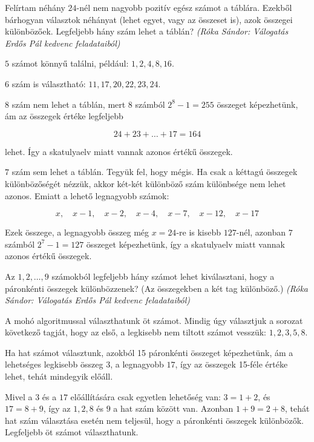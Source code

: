 \begin{extraproblem}
Felírtam néhány $24$-nél nem nagyobb pozitív egész számot a táblára.
Ezekből bárhogyan választok néhányat (lehet egyet, vagy az összeset
is), azok összegei különbözőek. Legfeljebb hány szám lehet a táblán?
\emph{(Róka Sándor: Válogatás Erdős Pál kedvenc feladataiból) }
\end{extraproblem}
\begin{solution}
$5$ számot könnyű találni, például: $1,2,4,8,16$.

$6$ szám is választható: $11,17,20,22,23,24$.

$8$ szám nem lehet a táblán, mert 8 számból $2^{8}-1=255$ összeget
képezhetünk, ám az összegek értéke legfeljebb

\[
24+23+\ldots+17=164
\]

lehet. Így a skatulyaelv miatt vannak azonos értékű összegek.

$7$ szám sem lehet a táblán. Tegyük fel, hogy mégis. Ha csak a kéttagú
összegek különbözőségét nézzük, akkor két-két különböző szám különbsége
nem lehet azonos. Emiatt a lehető legnagyobb számok:

\[
x,\quad x-1,\quad x-2,\quad x-4,\quad x-7,\quad x-12,\quad x-17
\]

Ezek összege, a legnagyobb összeg még $x=24$-re is kisebb $127$-nél,
azonban $7$ számból $2^{7}-1=127$ összeget képezhetünk, így a skatulyaelv
miatt vannak azonos értékű összegek.
\end{solution}
\begin{extraproblem}
Az $1,2,\ldots,9$ számokból legfeljebb hány számot lehet kiválasztani,
hogy a páronkénti összegek különbözzenek? (Az összegekben a két tag
különböző.) \emph{(Róka Sándor: Válogatás Erdős Pál kedvenc feladataiból) }
\end{extraproblem}
\begin{solution}
A mohó algoritmussal választhatunk öt számot. Mindig úgy választjuk
a sorozat következő tagját, hogy az első, a legkisebb nem tiltott
számot vesszük: $1,2,3,5,8$.

Ha hat számot választunk, azokból 15 páronkénti összeget képezhetünk,
ám a lehetséges legkisebb összeg $3$, a legnagyobb $17$, így az
összegek 15-féle értéke lehet, tehát mindegyik előáll.

Mivel a $3$ és a $17$ előállítására csak egyetlen lehetőség van:
$3=1+2$, és $17=8+9$, így az $1,2,8$ és $9$ a hat szám között
van. Azonban $1+9=2+8$, tehát hat szám választása esetén nem teljesül,
hogy a páronkénti összegek különbözők. Legfeljebb öt számot választhatunk. 
\end{solution}
